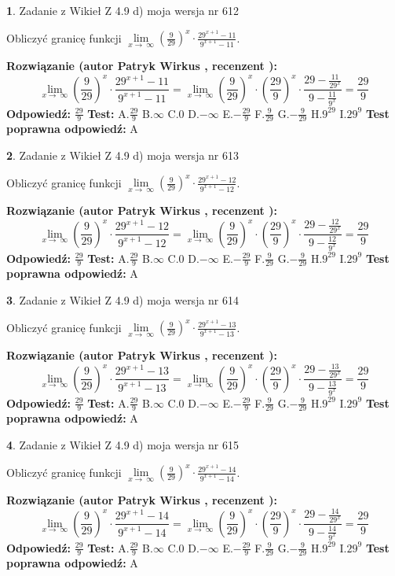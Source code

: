 \documentclass[12pt, a4paper]{article}
\theoremstyle{definition} %
\newtheorem{zad}{}
\newcommand{\zadStart}[1]{\begin{zad}#1\newline}
\newcommand{\zadStop}{\end{zad}}
\newcommand{\rozwStart}[2]{\noindent \textbf{Rozwiązanie (autor #1 , recenzent #2): }\newline}
\newcommand{\rozwStop}{\newline}
\newcommand{\odpStart}{\noindent \textbf{Odpowiedź:}\newline}
\newcommand{\odpStop}{\newline}
\newcommand{\testStart}{\noindent \textbf{Test:}\newline}
\newcommand{\testStop}{\newline}
\newcommand{\kluczStart}{\noindent \textbf{Test poprawna odpowiedź:}\newline}
\newcommand{\kluczStop}{\newline}
\begin{document}
\zadStart{Zadanie z Wikieł Z 4.9 d) moja wersja nr 612}


Obliczyć granicę funkcji  $\lim\limits_{x\to\ \infty}(\frac{9}{29})^{x}\cdot\frac{29^{x+1}-11}{9^{x+1}-11}$.
\zadStop
\rozwStart{Patryk Wirkus}{}
$$\lim\limits_{x\to\ \infty}(\frac{9}{29})^{x}\cdot\frac{29^{x+1}-11}{9^{x+1}-11}=\lim\limits_{x\to\ \infty}(\frac{9}{29})^{x}\cdot(\frac{29}{9})^{x} \cdot \frac{29-\frac{11}{29^{x}}}{9-\frac{11}{9^{x}}} = \frac{29}{9}$$
\rozwStop
\odpStart
$\frac{29}{9}$
\odpStop
\testStart
A.$\frac{29}{9}$ B.$\infty$ C.$0$ D.$-\infty$ E.$-\frac{29}{9}$
F.$\frac{9}{29}$ G.$-\frac{9}{29}$
H.$9^{29}$
I.$29^{9}$
\testStop
\kluczStart
A
\kluczStop



\zadStart{Zadanie z Wikieł Z 4.9 d) moja wersja nr 613}


Obliczyć granicę funkcji  $\lim\limits_{x\to\ \infty}(\frac{9}{29})^{x}\cdot\frac{29^{x+1}-12}{9^{x+1}-12}$.
\zadStop
\rozwStart{Patryk Wirkus}{}
$$\lim\limits_{x\to\ \infty}(\frac{9}{29})^{x}\cdot\frac{29^{x+1}-12}{9^{x+1}-12}=\lim\limits_{x\to\ \infty}(\frac{9}{29})^{x}\cdot(\frac{29}{9})^{x} \cdot \frac{29-\frac{12}{29^{x}}}{9-\frac{12}{9^{x}}} = \frac{29}{9}$$
\rozwStop
\odpStart
$\frac{29}{9}$
\odpStop
\testStart
A.$\frac{29}{9}$ B.$\infty$ C.$0$ D.$-\infty$ E.$-\frac{29}{9}$
F.$\frac{9}{29}$ G.$-\frac{9}{29}$
H.$9^{29}$
I.$29^{9}$
\testStop
\kluczStart
A
\kluczStop



\zadStart{Zadanie z Wikieł Z 4.9 d) moja wersja nr 614}


Obliczyć granicę funkcji  $\lim\limits_{x\to\ \infty}(\frac{9}{29})^{x}\cdot\frac{29^{x+1}-13}{9^{x+1}-13}$.
\zadStop
\rozwStart{Patryk Wirkus}{}
$$\lim\limits_{x\to\ \infty}(\frac{9}{29})^{x}\cdot\frac{29^{x+1}-13}{9^{x+1}-13}=\lim\limits_{x\to\ \infty}(\frac{9}{29})^{x}\cdot(\frac{29}{9})^{x} \cdot \frac{29-\frac{13}{29^{x}}}{9-\frac{13}{9^{x}}} = \frac{29}{9}$$
\rozwStop
\odpStart
$\frac{29}{9}$
\odpStop
\testStart
A.$\frac{29}{9}$ B.$\infty$ C.$0$ D.$-\infty$ E.$-\frac{29}{9}$
F.$\frac{9}{29}$ G.$-\frac{9}{29}$
H.$9^{29}$
I.$29^{9}$
\testStop
\kluczStart
A
\kluczStop



\zadStart{Zadanie z Wikieł Z 4.9 d) moja wersja nr 615}


Obliczyć granicę funkcji  $\lim\limits_{x\to\ \infty}(\frac{9}{29})^{x}\cdot\frac{29^{x+1}-14}{9^{x+1}-14}$.
\zadStop
\rozwStart{Patryk Wirkus}{}
$$\lim\limits_{x\to\ \infty}(\frac{9}{29})^{x}\cdot\frac{29^{x+1}-14}{9^{x+1}-14}=\lim\limits_{x\to\ \infty}(\frac{9}{29})^{x}\cdot(\frac{29}{9})^{x} \cdot \frac{29-\frac{14}{29^{x}}}{9-\frac{14}{9^{x}}} = \frac{29}{9}$$
\rozwStop
\odpStart
$\frac{29}{9}$
\odpStop
\testStart
A.$\frac{29}{9}$ B.$\infty$ C.$0$ D.$-\infty$ E.$-\frac{29}{9}$
F.$\frac{9}{29}$ G.$-\frac{9}{29}$
H.$9^{29}$
I.$29^{9}$
\testStop
\kluczStart
A
\kluczStop
\end{document}
